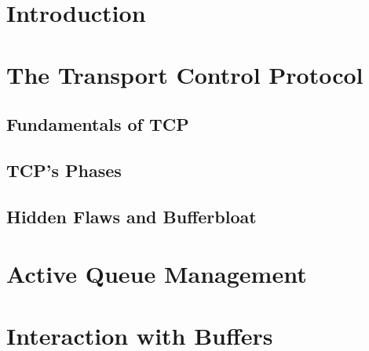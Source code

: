 \documentclass[letter, 11pt]{article}
\begin{document}




\newpage

\tableofcontents
\newpage
\listoffigures
\listoftables

\newpage

\doublespacing
\section{Introduction}


\newpage

%
\section{The Transport Control Protocol}


\subsection{Fundamentals of TCP}


\subsection{TCP's Phases }
%

\subsection{Hidden Flaws and Bufferbloat}
%

\newpage

\section{Active Queue Management}

\newpage

\section{Interaction with Buffers}
\end{document}
